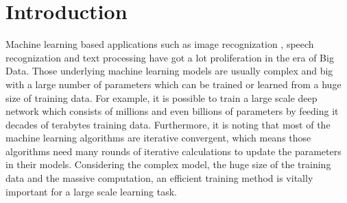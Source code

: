 \documentclass[10pt,journal,finalsubmission,compsoc]{IEEEtran}
\begin{document}
\maketitle

\IEEEpeerreviewmaketitle

\section{Introduction}
\label{introduction}

Machine learning based applications such as image recognization \cite{Coates2011An}, speech recognization \cite{dahl2012context} and text processing \cite{collobert2008unified} have got a lot proliferation in the era of Big Data. Those underlying machine learning models are usually complex and big with a large number of parameters which can be trained or learned from a huge size of training data. For example, it is possible to train a large scale deep network which consists of millions and even billions of parameters by feeding it decades of terabytes training data. Furthermore, it is noting that most of the machine learning algorithms are iterative convergent, which means those algorithms need many rounds of iterative calculations to update the parameters in their models. Considering the complex model, the huge size of the training data and the massive computation, an efficient training method is vitally important for a large scale learning task.
\end{document}
